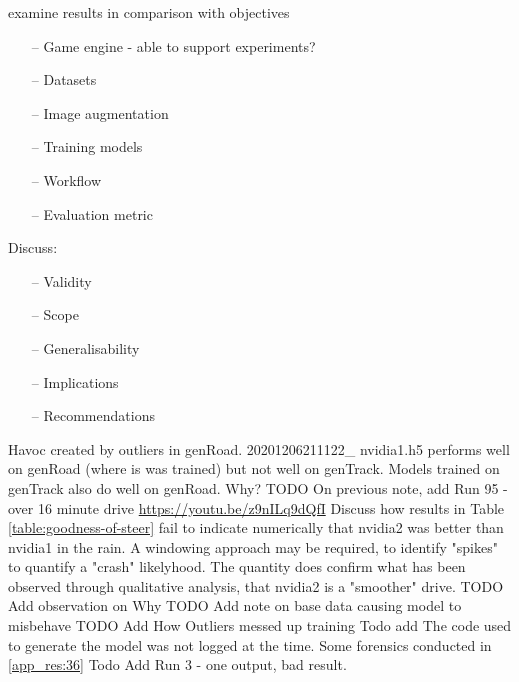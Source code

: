 examine results in comparison with objectives
\begin{itemize}
    \item[--] Game engine - able to support experiments?
    \item[--] Datasets
    \item[--] Image augmentation
    \item[--] Training models
    \item[--] Workflow
    \item[--] Evaluation metric
\end{itemize}
Discuss:
\begin{itemize}
    \item[--] Validity
    \item[--] Scope
    \item[--] Generalisability
    \item[--] Implications
    \item[--] Recommendations
\end{itemize}
Havoc created by outliers in genRoad. 20201206211122\_ nvidia1.h5 performs well on genRoad (where is was trained) but not well on genTrack. Models trained on genTrack also do well on genRoad. Why?
TODO On previous note, add Run 95 - over 16 minute drive \url{https://youtu.be/z9nILq9dQfI}  
Discuss how results in Table \ref{table:goodness-of-steer} fail to indicate numerically that nvidia2 was better than nvidia1 in the rain. A windowing approach may be required, to identify "spikes" to quantify a "crash" likelyhood. The quantity does confirm what has been observed through qualitative analysis, that nvidia2 is a "smoother" drive.  
TODO Add observation on Why
TODO Add note on base data causing model to misbehave
TODO Add How Outliers messed up training
Todo add The code used to generate the model was not logged at the time. Some forensics conducted in \ref{app_res:36}
Todo Add Run 3 - one output, bad result.